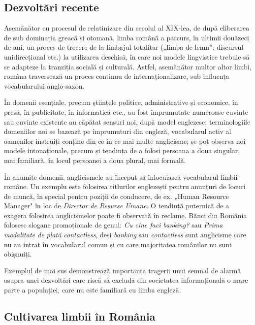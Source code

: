 \begin{multicols}{2}
\subsection{Dezvoltări recente}

Asemănător cu procesul de relatinizare din secolul al XIX-lea, de după eliberarea de sub dominația greacă și otomană, limba română a parcurs, în ultimii douăzeci de ani, un proces de trecere de la limbajul totalitar („limba de lemn”, discursul unidirecțional etc.) la utilizarea deschisă, în care noi modele lingvistice trebuie să se adapteze la tranziția socială și culturală. Astfel, asemănător multor altor limbi, româna traversează un proces continuu de internaționalizare, sub influența vocabularului anglo-saxon.

În domenii esențiale, precum științele politice, administrative și economice, în presă, în publicitate, în informatică etc., au fost împrumutate numeroase cuvinte sau cuvinte existente au căpătat sensuri noi, după model englezesc; terminologiile domeniilor noi se bazează pe împrumuturi din engleză, vocabularul activ al oamenilor instruiți conține din ce în ce mai multe anglicisme; se pot observa noi modele intonaționale, precum și tendința de a folosi persoana a doua singular, mai familiară, în locul persoanei a doua plural, mai formală.

În anumite domenii, anglicismele au început să înlocuiască vocabularul limbii române. Un exemplu este folosirea titlurilor englezești pentru anunțuri de locuri de muncă, în special pentru poziții de conducere, de ex. „Human Resource Manager" în loc de \textit{Director de Resurse Umane}. O tendință puternică de a exagera folosirea anglicismelor poate fi observată în reclame. Bănci din România folosesc slogane promoționale de genul: \textit{Cu cine faci banking?} sau \textit{Prima modalitate de plată contactless}, deși \textit{banking} sau \textit{contactless} sunt anglicisme care nu au intrat în vocabularul comun și cu care majoritatea românilor nu sunt obișnuiți.

Exemplul de mai sus demonstrează importanța tragerii unui semnal de alarmă asupra unei dezvoltări care riscă să excludă din societatea informațională o mare parte a populației, care nu este familiară cu limba engleză.

\subsection{Cultivarea limbii în România}


\end{multicols}
